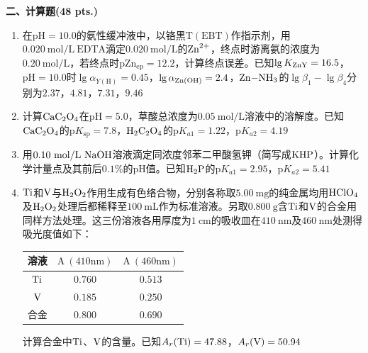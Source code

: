 \vspace{0.5cm}
\noindent\textbf{二、计算题(48 pts.)}

\begin{enumerate}[label=\arabic*., itemsep=1.5ex]
    \item 在$\mathrm{pH}=10.0$的氨性缓冲液中，以铬黑$\mathrm{T(EBT)}$作指示剂，用$0.020\ \mathrm{mol/L}\ \mathrm{EDTA}$滴定$0.020\ \mathrm{mol/L}$的$\ce{Zn^{2+}}$，终点时游离氨的浓度为$0.20\ \mathrm{mol/L}$，若终点时$\mathrm{pZn_{ep}}=12.2$，计算终点误差。已知$\lg K_{\ce{ZnY}}=16.5$，$\mathrm{pH}=10.0$时$\lg\alpha_{Y(\mathrm{H})}=0.45$，$\lg\alpha_{\ce{Zn(OH)}}=2.4$，$\ce{Zn-NH3}$的$\lg\beta_1-\lg\beta_4$分别为$2.37$，$4.81$，$7.31$，$9.46$
    \item 计算$\ce{CaC2O4}$在$\mathrm{pH}=5.0$，草酸总浓度为$0.05\ \mathrm{mol/L}$溶液中的溶解度。已知$\ce{CaC2O4}$的$\mathrm{p}K_{\mathrm{sp}}=7.8$，$\ce{H2C2O4}$的$\mathrm{p}K_{a1}=1.22$，$\mathrm{p}K_{a2}=4.19$
    \item 用$0.10\ \mathrm{mol/L}\ \ce{NaOH}$溶液滴定同浓度邻苯二甲酸氢钾（简写成$\ce{KHP}$）。计算化学计量点及其前后$0.1\%$的$\mathrm{pH}$值。已知$\ce{H2P}$的$\mathrm{p}K_{a1}=2.95$，$\mathrm{p}K_{a2}=5.41$
    \item $\ce{Ti}$和$\ce{V}$与$\ce{H2O2}$作用生成有色络合物，分别各称取$5.00\ \mathrm{mg}$的纯金属均用$\ce{HClO4}$及$\ce{H2O2}$处理后都稀释至$100\ \mathrm{mL}$作为标准溶液。另取$0.800\ \mathrm{g}$含$\ce{Ti}$和$\ce{V}$的合金用同样方法处理。这三份溶液各用厚度为$1\ \mathrm{cm}$的吸收皿在$410\ \mathrm{nm}$及$460\ \mathrm{nm}$处测得吸光度值如下：
    \begin{center}
    \begin{tabular}{|c|c|c|}
    \hline
    溶液 & $\mathrm{A\ (410nm)}$ & $\mathrm{A\ (460nm)}$ \\
    \hline
    $\ce{Ti}$ & $0.760$ & $0.513$ \\
    \hline
    $\ce{V}$ & $0.185$ & $0.250$ \\
    \hline
    合金 & $0.800$ & $0.690$ \\
    \hline
    \end{tabular}
    \end{center}
    计算合金中$\ce{Ti}$、$\ce{V}$的含量。已知$A_r(\ce{Ti})=47.88$，$A_r(\ce{V})=50.94$
\end{enumerate}
